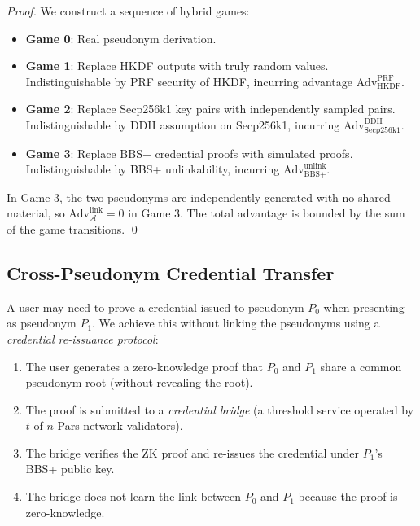 \documentclass[11pt,a4paper]{article}
\begin{document}
\begin{proof}
We construct a sequence of hybrid games:
\begin{itemize}
    \item \textbf{Game 0}: Real pseudonym derivation.
    \item \textbf{Game 1}: Replace HKDF outputs with truly random values. Indistinguishable
          by PRF security of HKDF, incurring advantage $\text{Adv}^{\text{PRF}}_{\text{HKDF}}$.
    \item \textbf{Game 2}: Replace Secp256k1 key pairs with independently sampled pairs.
          Indistinguishable by DDH assumption on Secp256k1, incurring
          $\text{Adv}^{\text{DDH}}_{\text{Secp256k1}}$.
    \item \textbf{Game 3}: Replace BBS+ credential proofs with simulated proofs.
          Indistinguishable by BBS+ unlinkability, incurring
          $\text{Adv}^{\text{unlink}}_{\text{BBS+}}$.
\end{itemize}
In Game 3, the two pseudonyms are independently generated with no shared material,
so $\text{Adv}^{\text{link}}_{\mathcal{A}} = 0$ in Game 3. The total advantage
is bounded by the sum of the game transitions. \qed
\end{proof}

\subsection{Cross-Pseudonym Credential Transfer}

A user may need to prove a credential issued to pseudonym $P_0$ when presenting
as pseudonym $P_1$. We achieve this without linking the pseudonyms using a
\emph{credential re-issuance protocol}:

\begin{enumerate}
    \item The user generates a zero-knowledge proof that $P_0$ and $P_1$ share
          a common pseudonym root (without revealing the root).
    \item The proof is submitted to a \emph{credential bridge} (a threshold service
          operated by $t$-of-$n$ Pars network validators).
    \item The bridge verifies the ZK proof and re-issues the credential under $P_1$'s
          BBS+ public key.
    \item The bridge does not learn the link between $P_0$ and $P_1$ because the
          proof is zero-knowledge.
\end{enumerate}
\end{document}
